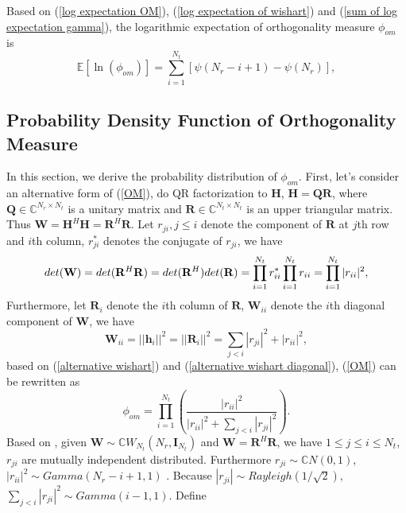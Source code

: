 \documentclass[12pt, draftclsnofoot, onecolumn]{IEEEtran}
\begin{document}
Based on (\ref{log expectation OM}), (\ref{log expectation of wishart}) and (\ref{sum of log expectation gamma}), the logarithmic expectation of orthogonality measure $\phi_{om}$ is 
\begin{equation}
\mathbb{E}[\ln(\phi_{om})]=\sum_{i=1}^{N_{t}}[\psi(N_{r}-i+1)-\psi(N_{r})],
\label{final log expectation OM}
\end{equation}
\subsection{Probability Density Function of Orthogonality Measure}
In this section, we derive the probability distribution of $\phi_{om}$. First, let's consider an alternative form of (\ref{OM}), do QR factorization to $\mathbf{H}$, $\mathbf{H}=\mathbf{Q}\mathbf{R}$\cite{watkins2004fundamentals}, where $\mathbf{Q}\in\mathbb{C}^{N_{r}\times N_{t}}$ is a unitary matrix and $\mathbf{R}\in\mathbb{C}^{N_{t}\times N_{t}}$ is an upper triangular matrix. Thus $\mathbf{W}=\mathbf{H}^{H}\mathbf{H}=\mathbf{R}^{H}\mathbf{R}$. Let $r_{ji}, j\leq i$ denote the component of $\mathbf{R}$ at $j$th row and $i$th column, $r^{*}_{ji}$ denotes the conjugate of $r_{ji}$, we have
\begin{equation}
det(\mathbf{W})=det(\mathbf{R}^{H}\mathbf{R})=det(\mathbf{R}^{H})det(\mathbf{R})\\=\prod_{i=1}^{N_{t}}r_{ii}^{*}\prod_{i=1}^{N_{t}}r_{ii}=\prod_{i=1}^{N_{t}}|r_{ii}|^{2},
\label{alternative wishart}
\end{equation}
Furthermore, let $\mathbf{R}_{i}$ denote the $i$th column of $\mathbf{R}$, $\mathbf{W}_{ii}$ denote the $i$th diagonal component of $\mathbf{W}$, we have
\begin{equation}
\mathbf{W}_{ii}=||\mathbf{h}_{i}||^{2}=||\mathbf{R}_{i}||^{2}=\sum_{j<i}|r_{ji}|^{2}+|r_{ii}|^{2},
\label{alternative wishart diagonal}
\end{equation}
based on (\ref{alternative wishart}) and (\ref{alternative wishart diagonal}), (\ref{OM}) can be rewritten as 
\begin{equation}
\phi_{om}=\prod_{i=1}^{N_{t}}(\frac{|r_{ii}|^{2}}{|r_{ii}|^{2}+\sum_{j<i}|r_{ji}|^{2}}).
\label{alternative OM}
\end{equation}
Based on \cite{nagar2011expectations}, given $\mathbf{W}\sim \mathbb{C}W_{N_{t}}(N_{r}, \mathbf{I}_{N_{t}})$ and $\mathbf{W}=\mathbf{R}^{H}\mathbf{R}$, we have $1\leq j\leq i\leq N_{t}$, $r_{ji}$ are mutually independent distributed. Furthermore $r_{ji}\sim \mathbb{C}N(0,1)$, $|r_{ii}|^{2}\sim Gamma(N_{r}-i+1,1)$ . Because $|r_{ji}|\sim Rayleigh(1/\sqrt{2})$, $\sum_{j<i}|r_{ji}|^{2}\sim Gamma(i-1, 1)$. Define 
\end{document}
